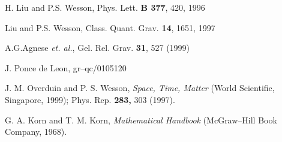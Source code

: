 \documentclass[a4paper,preprint,prabib,aps]{revtex4}
\begin{document}
\begin{references}
 H. Liu and P.S. Wesson, Phys. Lett. {\bf B 377}, 420, 1996

 Liu and P.S. Wesson, Class. Quant. Grav. {\bf 14}, 1651, 1997

 A.G.Agnese {\it et. al.}, Gel. Rel. Grav. {\bf 31},
527 (1999)

 J. Ponce de Leon, gr--qc/0105120

  J. M. Overduin and P. S. Wesson, {\it Space, Time, Matter}
(World Scientific, Singapore, 1999); Phys. Rep. {\bf 283,} 303 (1997).

  G. A. Korn and T. M. Korn, {\it Mathematical Handbook}
(McGraw--Hill Book Company, 1968).


\end{references}
\end{document}

